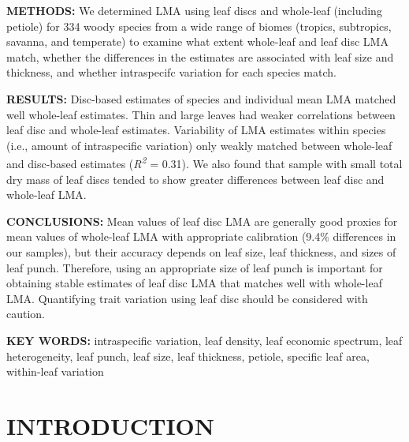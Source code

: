 \documentclass[
  12pt,
  a4paper,
,tablecaptionabove
]{scrartcl}
\begin{document}
\textbf{METHODS:} We determined LMA using leaf discs and whole-leaf
(including petiole) for 334 woody species from a wide range of biomes
(tropics, subtropics, savanna, and temperate) to examine what extent
whole-leaf and leaf disc LMA match, whether the differences in the
estimates are associated with leaf size and thickness, and whether
intraspecifc variation for each species match.

\textbf{RESULTS:} Disc-based estimates of species and individual mean
LMA matched well whole-leaf estimates. Thin and large leaves had weaker
correlations between leaf disc and whole-leaf estimates. Variability of
LMA estimates within species (i.e., amount of intraspecific variation)
only weakly matched between whole-leaf and disc-based estimates
(\emph{R\textsuperscript{2}} = 0.31). We also found that sample with
small total dry mass of leaf discs tended to show greater differences
between leaf disc and whole-leaf LMA.

\textbf{CONCLUSIONS:} Mean values of leaf disc LMA are generally good
proxies for mean values of whole-leaf LMA with appropriate calibration
(9.4\% differences in our samples), but their accuracy depends on leaf
size, leaf thickness, and sizes of leaf punch. Therefore, using an
appropriate size of leaf punch is important for obtaining stable
estimates of leaf disc LMA that matches well with whole-leaf LMA.
Quantifying trait variation using leaf disc should be considered with
caution.

\textbf{KEY WORDS:} intraspecific variation, leaf density, leaf economic
spectrum, leaf heterogeneity, leaf punch, leaf size, leaf thickness,
petiole, specific leaf area, within-leaf variation

\hypertarget{introduction}{%
\section{INTRODUCTION}\label{introduction}}
\end{document}
